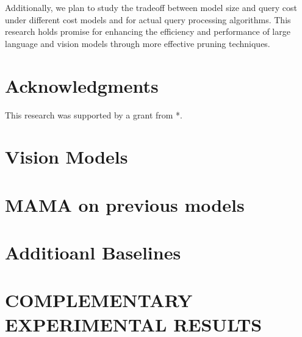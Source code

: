 \documentclass{article} %
\begin{document}
Additionally, we plan to study the tradeoff between model size and query cost under different cost models and for actual query processing algorithms. This research holds promise for enhancing the efficiency and performance of large language and vision models through more effective pruning techniques.

\section{Acknowledgments}
This research was supported by a grant from *.




\appendix
\section{Vision Models}

\section{MAMA on previous models}

\section{Additioanl Baselines}

\section{COMPLEMENTARY EXPERIMENTAL RESULTS}
\end{document}
